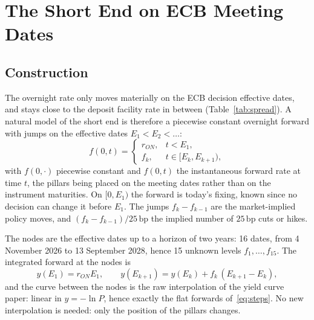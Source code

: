 \documentclass[11pt,a4paper]{article}
\theoremstyle{plain}
\theoremstyle{definition}
\newcommand{\bp}{\,\mathrm{bp}}
\begin{document}
\clearpage
\section{The Short End on ECB Meeting Dates}
\label{sec:meetings}

\subsection{Construction}
The overnight rate only moves materially on the ECB decision effective dates, and stays close to the deposit facility rate in between (Table~\ref{tab:spread}). A natural model of the short end is therefore a piecewise constant overnight forward with jumps on the effective dates $E_1<E_2<\dots$:
\begin{equation}
    f(0,t)=
    \begin{cases}
        r_{ON}, & t<E_1,\\
        f_k, & t\in[E_k,E_{k+1}),
    \end{cases}
    \label{eq:steps}
\end{equation}
with $f(0,\cdot)$ piecewise constant and $f(0,t)$ the instantaneous forward rate at time $t$, the pillars being placed on the meeting dates rather than on the instrument maturities. On $[0,E_1)$ the forward is today's fixing, known since no decision can change it before $E_1$. The jumps $f_{k}-f_{k-1}$ are the market-implied policy moves, and $(f_{k}-f_{k-1})/25\bp$ the implied number of $25\bp$ cuts or hikes.

The nodes are the effective dates up to a horizon of two years: 16 dates, from 4 November 2026 to 13 September 2028, hence 15 unknown levels $f_1,\dots,f_{15}$. The integrated forward at the nodes is
\begin{equation}
    y(E_1)=r_{ON}E_1,\qquad y(E_{k+1})=y(E_k)+f_k\,(E_{k+1}-E_k),
\end{equation}
and the curve between the nodes is the raw interpolation of the yield curve paper: linear in $y=-\ln P$, hence exactly the flat forwards of~\eqref{eq:steps}. No new interpolation is needed: only the position of the pillars changes.
\end{document}
